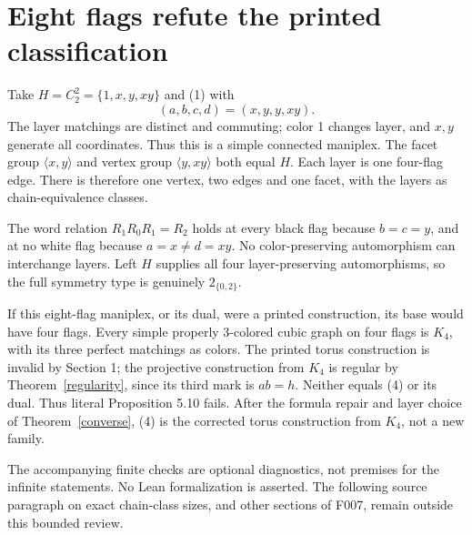 \documentclass[a4paper,11pt]{article}
\begin{document}
\section{Eight flags refute the printed classification}
Take $H=C_2^2=\{1,x,y,xy\}$ and (1) with
\[
 (a,b,c,d)=(x,y,y,xy).\tag{4}
\]
The layer matchings are distinct and commuting; color 1 changes layer, and
$x,y$ generate all coordinates. Thus this is a simple connected maniplex.
The facet group $\langle x,y\rangle$ and vertex group $\langle y,xy\rangle$
both equal $H$. Each layer is one four-flag edge. There is therefore one
vertex, two edges and one facet, with the layers as chain-equivalence classes.

The word relation $R_1R_0R_1=R_2$ holds at every black flag because $b=c=y$,
and at no white flag because $a=x\ne d=xy$. No color-preserving automorphism
can interchange layers. Left $H$ supplies all four layer-preserving
automorphisms, so the full symmetry type is genuinely $2_{\{0,2\}}$.

If this eight-flag maniplex, or its dual, were a printed construction, its
base would have four flags. Every simple properly 3-colored cubic graph on
four flags is $K_4$, with its three perfect matchings as colors. The printed
torus construction is invalid by Section 1; the projective construction from
$K_4$ is regular by Theorem~\ref{regularity}, since its third mark is $ab=h$.
Neither equals (4) or its dual. Thus literal Proposition 5.10 fails. After the
formula repair and layer choice of Theorem~\ref{converse}, (4) is the
corrected torus construction from $K_4$, not a new family.

The accompanying finite checks are optional diagnostics, not premises for the
infinite statements. No Lean formalization is asserted. The following source
paragraph on exact chain-class sizes, and other sections of F007, remain
outside this bounded review.
\end{document}
